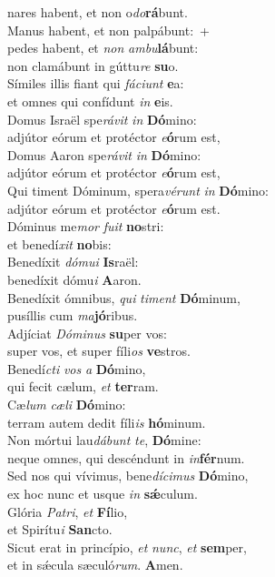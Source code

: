 {nares habent, et non o\textit{do}\textbf{rá}bunt.\\
\vin Manus habent, et non palpábunt:~+\\
\vin  pedes habent, et \textit{non} \textit{am}\textit{bu}\textbf{lá}bunt:~\*\\
\vin non clamábunt in gúttu\textit{re} \textbf{su}o.\\
Símiles illis fiant qui \textit{fá}\textit{ci}\textit{unt} \textbf{e}a:~\*\\
et omnes qui confídunt \textit{in} \textbf{e}is.\\
\vin Domus Israël spe\textit{rá}\textit{vit} \textit{in} \textbf{Dó}mino:~\*\\
\vin adjútor eórum et protéctor \textit{e}\textbf{ó}rum est,\\
Domus Aaron spe\textit{rá}\textit{vit} \textit{in} \textbf{Dó}mino:~\*\\
adjútor eórum et protéctor \textit{e}\textbf{ó}rum est,\\
\vin Qui timent Dóminum, spera\textit{vé}\textit{runt} \textit{in} \textbf{Dó}mino:~\*\\
\vin adjútor eórum et protéctor \textit{e}\textbf{ó}rum est.\\
Dóminus me\textit{mor} \textit{fu}\textit{it} \textbf{no}stri:~\*\\
et benedí\textit{xit} \textbf{no}bis:\\
\vin Benedíxit \textit{dó}\textit{mu}\textit{i} \textbf{Is}raël:~\*\\
\vin benedíxit dómu\textit{i} \textbf{A}aron.\\
Benedíxit ómnibus, \textit{qui} \textit{ti}\textit{ment} \textbf{Dó}minum,~\*\\
pusíllis cum \textit{ma}\textbf{jó}ribus.\\
\vin Adjíciat \textit{Dó}\textit{mi}\textit{nus} \textbf{su}per vos:~\*\\
\vin super vos, et super fíli\textit{os} \textbf{ve}stros.\\
Benedí\textit{cti} \textit{vos} \textit{a} \textbf{Dó}mino,~\*\\
qui fecit cælum, \textit{et} \textbf{ter}ram.\\
\vin Cæ\textit{lum} \textit{cæ}\textit{li} \textbf{Dó}mino:~\*\\
\vin terram autem dedit fíli\textit{is} \textbf{hó}minum.\\
Non mórtui lau\textit{dá}\textit{bunt} \textit{te}, \textbf{Dó}mine:~\*\\
neque omnes, qui descéndunt in \textit{in}\textbf{fér}num.\\
\vin Sed nos qui vívimus, bene\textit{dí}\textit{ci}\textit{mus} \textbf{Dó}mino,~\*\\
\vin ex hoc nunc et usque \textit{in} \textbf{sǽ}culum.\\
Glória \textit{Pa}\textit{tri}, \textit{et} \textbf{Fí}lio,~\*\\
et Spirítu\textit{i} \textbf{San}cto.\\
\vin Sicut erat in princípio, \textit{et} \textit{nunc}, \textit{et} \textbf{sem}per,~\*\\
\vin et in sǽcula sæculó\textit{rum}. \textbf{A}men.\\
}

